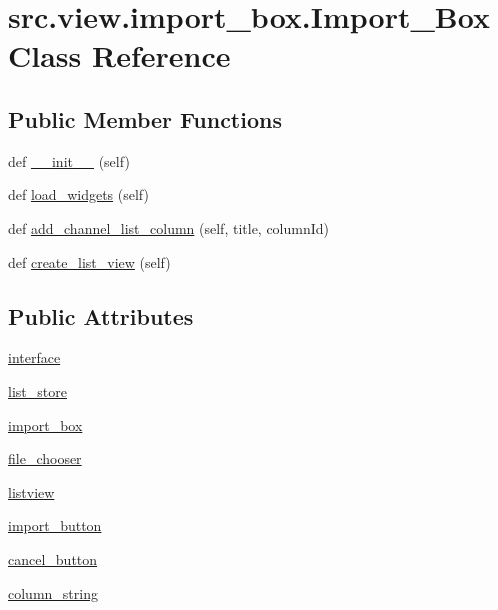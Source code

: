 \hypertarget{classsrc_1_1view_1_1import__box_1_1Import__Box}{}\section{src.\+view.\+import\+\_\+box.\+Import\+\_\+\+Box Class Reference}
\label{classsrc_1_1view_1_1import__box_1_1Import__Box}
\subsection*{Public Member Functions}
\begin{DoxyCompactItemize}
\item 
def \hyperlink{classsrc_1_1view_1_1import__box_1_1Import__Box_a980ff19bccf27c3ace2757bf3d21d544}{\+\_\+\+\_\+init\+\_\+\+\_\+} (self)
\item 
def \hyperlink{classsrc_1_1view_1_1import__box_1_1Import__Box_a628b88d4e8873da8133d4f50ea2040c9}{load\+\_\+widgets} (self)
\item 
def \hyperlink{classsrc_1_1view_1_1import__box_1_1Import__Box_a8620c450eb5607f9857a40dbb444532e}{add\+\_\+channel\+\_\+list\+\_\+column} (self, title, column\+Id)
\item 
def \hyperlink{classsrc_1_1view_1_1import__box_1_1Import__Box_a054730216a86fdf30d112f0d3d1c007e}{create\+\_\+list\+\_\+view} (self)
\end{DoxyCompactItemize}
\subsection*{Public Attributes}
\begin{DoxyCompactItemize}
\item 
\hyperlink{classsrc_1_1view_1_1import__box_1_1Import__Box_a30315ea7c99d5b2b0ec03d5f4e6120f1}{interface}
\item 
\hyperlink{classsrc_1_1view_1_1import__box_1_1Import__Box_a48f1cbbe91d103740c2d588fbe8693a9}{list\+\_\+store}
\item 
\hyperlink{classsrc_1_1view_1_1import__box_1_1Import__Box_a408b0d337f0b93ce213901aee88229a7}{import\+\_\+box}
\item 
\hyperlink{classsrc_1_1view_1_1import__box_1_1Import__Box_a8f6f1574375ec06ef85902bbb8454fa4}{file\+\_\+chooser}
\item 
\hyperlink{classsrc_1_1view_1_1import__box_1_1Import__Box_ad3fd38bc76c9b99490a2db8f23a8a931}{listview}
\item 
\hyperlink{classsrc_1_1view_1_1import__box_1_1Import__Box_a5ba4fec0b0b0cc09dd0cb934bd7e9838}{import\+\_\+button}
\item 
\hyperlink{classsrc_1_1view_1_1import__box_1_1Import__Box_a33583bc04661d89411c748086eeb8e63}{cancel\+\_\+button}
\item 
\hyperlink{classsrc_1_1view_1_1import__box_1_1Import__Box_ad8dc2dc065a25c5f266f73486aec64f0}{column\+\_\+string}
\end{DoxyCompactItemize}


